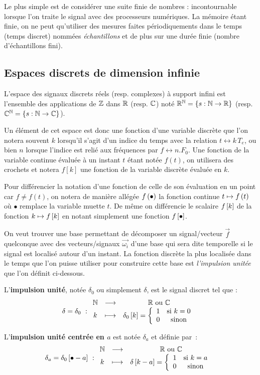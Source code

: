 Le plus simple est de considérer une suite finie de nombres :
incontournable lorsque l'on traite le signal avec des processeurs
numériques.  La mémoire étant finie, on ne peut qu'utiliser des
mesures faites périodiquements dans le temps (temps discret) nommées
\emph{échantillons} et de plus sur une durée finie (nombre
d'échantillons fini).


\subsection{Espaces discrets de dimension infinie}

L'espace des signaux discrets réels (resp. complexes) à support infini
est l'ensemble des applications de $\mathbb{Z}$ dans $\mathbb{R}$ (resp. $\mathbb{C}$) noté
$\mathbb{R}^{\mathbb{N}} = \left\{s : \mathbb{N} \to \mathbb{R} \right\}$ (resp.
$\mathbb{C}^{\mathbb{N}} = \left\{s : \mathbb{N} \to \mathbb{C} \right\}$).


Un élément de cet espace est donc une fonction d'une variable discrète
que l'on notera souvent $k$ lorsqu'il s'agit d'un indice du temps avec
la relation $t \leftrightarrow k\,T_e$, ou bien $n$ lorsque l'indice
est relié aux fréquences par $f \leftrightarrow n.F_0$. Une fonction
de la variable continue évaluée à un instant $t$ étant notée $f(t)$,
on utilisera des crochets et notera $f[k]$ une fonction de la variable
discrète évaluée en $k$.

Pour différencier la notation d'une fonction de celle de son
évaluation en un point car $f\neq f(t)$, on notera de manière allégée
$f\left(\bullet\right)$ la fonction continue $t\mapsto f\left(t\right)$ où $\bullet$
remplace la variable muette $t$. De même on différencie le scalaire
$f\left[k\right]$ de la fonction $k\mapsto f\left[k\right]$ en notant simplement une
fonction $f\left[\bullet\right]$.

On veut trouver une base permettant de décomposer un signal/vecteur
$\vec{f}$ quelconque avec des vecteurs/signaux $\vec{\omega_i}$ d'une
base qui sera dite temporelle si le signal est localisé autour d'un
instant. La fonction discrète la plus localisée dans le temps que l'on
puisse utiliser pour construire cette base est \emph{l'impulsion
  unitée} que l'on définit ci-dessous.
\begin{definition}
  \label{def:impulsion_unite}
  L'\textbf{impulsion unité}, notée $\delta_0$ ou simplement $\delta$,
  est le signal discret tel que :
  $$
  \delta=\delta_0~:\begin{array}{ccc} \mathbb{N} & \longrightarrow & \mathbb{R} \text{ ou } \mathbb{C} \\  k & \longmapsto & \delta_0\left[k\right]=\left\{\begin{array}{cc} {1} & {\text{si } k=0}\\ {0} & {\text{sinon}}\\ \end{array}\right. \\ \end{array} 
  $$

  L'\textbf{impulsion unité centrée en $a$} est notée $\delta_a$ et définie par~:
  $$
  \delta_a = \delta_0\left[\bullet-a\right]~: \begin{array}{ccc} \mathbb{N} & \longrightarrow & \mathbb{R} \text{ ou } \mathbb{C} \\ k & \longmapsto & \delta\left[k-a\right] =  \left\{\begin{array}{cc} {1} & {\text{si } k=a}\\ {0} & {\text{sinon}}\\ \end{array}\right. \\ \end{array}
  $$
\end{definition}

